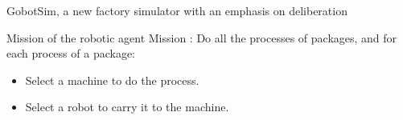 \begin{frame}{GobotSim, a new factory simulator with an emphasis on deliberation}

            
\end{frame}


            

    

\begin{frame}{Mission of the robotic agent}
    \centering
Mission : Do all the processes of packages, and for each process of a package:
\begin{itemize}
    \pause
    \item Select a machine to do the process.
    \pause
    \item Select a robot to carry it to the machine.
\end{itemize}

\end{frame}
